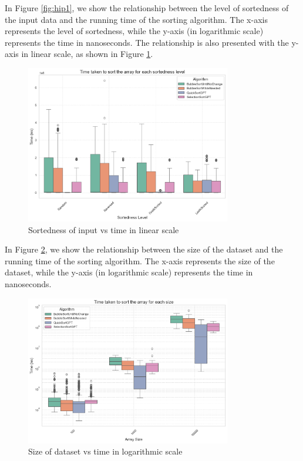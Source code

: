 \documentclass[unicode,11pt,a4paper,oneside,numbers=endperiod,openany]{scrartcl}
\begin{document}
    In Figure \ref{fig:hip1}, we show the relationship between the level of sortedness of the input data and the running time of the sorting algorithm. The x-axis represents the level of sortedness, while the y-axis (in logarithmic scale) represents the time in nanoseconds. The relationship is also presented with the y-axis in linear scale, as shown in Figure \ref{fig:hip1_linear}.\\
    \hfill

    \begin{figure}[htbp]
        \centering
        \includegraphics[width=0.8\textwidth]{./fig/hip1-nonLog.png}
        \caption{Sortedness of input vs time in linear scale}
        \label{fig:hip1_linear}
    \end{figure}

    In Figure \ref{fig:hip2}, we show the relationship between the size of the dataset and the running time of the sorting algorithm. The x-axis represents the size of the dataset, while the y-axis (in logarithmic scale) represents the time in nanoseconds.
\hfill



\begin{figure}[htbp]
    \centering
    \includegraphics[width=0.8\textwidth]{./fig/hip2.png}
    \caption{Size of dataset vs time in logarithmic scale}
    \label{fig:hip2}
\end{figure}
\end{document}
